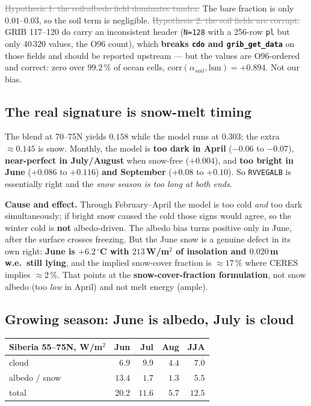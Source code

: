 \documentclass[10pt]{article}
\newcommand{\dead}[1]{\textcolor{gray}{\sout{#1}}}
\begin{document}
\dead{Hypothesis 1: the soil-albedo field dominates tundra.} The bare fraction is only
$0.01$--$0.03$, so the soil term is negligible. \dead{Hypothesis 2: the soil fields are
corrupt.} GRIB 117--120 do carry an inconsistent header (\texttt{N=128} with a 256-row
\texttt{pl} but only $40\,320$ values, the O96 count), which \textbf{breaks \texttt{cdo} and
\texttt{grib\_get\_data}} on those fields and should be reported upstream --- but the values
are O96-ordered and correct: zero over $99.2\,\%$ of ocean cells, $\mathrm{corr}(\alpha_{soil},
\mathrm{lsm})=+0.894$. Not our bias.

\subsection{The real signature is snow-melt timing}\label{sub:albsnow}
The blend at 70--75N yields $0.158$ while the model runs at $0.303$; the extra $\approx0.145$
is snow. Monthly, the model is \textbf{too dark in April} ($-0.06$ to $-0.07$),
\textbf{near-perfect in July/August} when snow-free ($+0.004$), and \textbf{too bright in June}
($+0.086$ to $+0.116$) \textbf{and September} ($+0.08$ to $+0.10$). So \texttt{RVVEGALB} is
essentially right and the \emph{snow season is too long at both ends}.

\textbf{Cause and effect.} Through February--April the model is too cold \emph{and} too dark
simultaneously; if bright snow caused the cold those signs would agree, so the winter cold is
\textbf{not} albedo-driven. The albedo bias turns positive only in June, after the surface
crosses freezing. But the June snow is a genuine defect in its own right: \textbf{June is
$+6.2\,^\circ$C with $213$\,W/m$^2$ of insolation and $0.020$\,m\,w.e.\ still lying}, and the
implied snow-cover fraction is $\approx17\,\%$ where CERES implies $\approx2\,\%$. That points
at the \textbf{snow-cover-fraction formulation}, not snow albedo (too \emph{low} in April) and
not melt energy (ample).

\subsection{Growing season: June is albedo, July is cloud}\label{sub:albgrow}
\begin{center}\footnotesize
\begin{tabular}{l r r r r}
\toprule
Siberia 55--75N, W/m$^2$ & Jun & Jul & Aug & JJA \\
\midrule
cloud             & $6.9$ & $\mathbf{9.9}$ & $4.4$ & $7.0$ \\
albedo / snow     & $\mathbf{13.4}$ & $1.7$ & $1.3$ & $5.5$ \\
total             & $20.2$ & $11.6$ & $5.7$ & $12.5$ \\
\bottomrule
\end{tabular}
\end{center}
\end{document}
